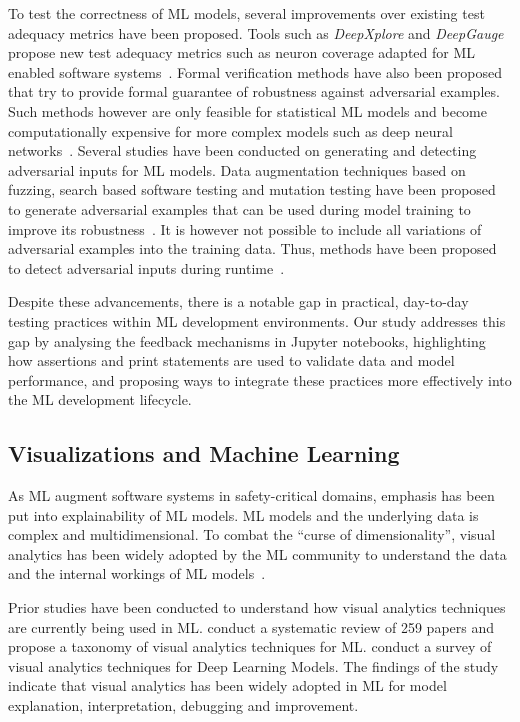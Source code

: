 \documentclass[smallextended]{svjour3}       %
\begin{document}
To test the correctness of ML models, several improvements over existing test adequacy metrics have been proposed. Tools such as \textit{DeepXplore} and \textit{DeepGauge} propose new test adequacy metrics such as neuron coverage adapted for ML enabled software systems~\citep{pei2017deepxplore,ma2018deepgauge,gerasimou2020importance-driven}. Formal verification methods have also been proposed that try to provide formal guarantee of robustness against adversarial examples. Such methods however are only feasible for statistical ML models and become computationally expensive for more complex models such as deep neural networks~\citep{zhu2021deepmemory,baluta2021scalable}. Several studies have been conducted on generating and detecting adversarial inputs for ML models. Data augmentation techniques based on fuzzing, search based software testing and mutation testing have been proposed to generate adversarial examples that can be used during model training to improve its robustness~\citep{braiek2019deepevolution,gao2020fuzz,wang2021robot,zhang2020white-box}. It is however not possible to include all variations of adversarial examples into the training data. Thus, methods have been proposed to detect adversarial inputs during runtime~\citep{xiao2021self-checking,wang2020dissector,wang2019adversarial,berend2020cats}.

Despite these advancements, there is a notable gap in practical, day-to-day testing practices within ML development environments. Our study addresses this gap by analysing the feedback mechanisms in Jupyter notebooks, highlighting how assertions and print statements are used to validate data and model performance, and proposing ways to integrate these practices more effectively into the ML development lifecycle.

\subsection{Visualizations and Machine Learning}\label{sec:visualizations}

As ML augment software systems in safety-critical domains, emphasis has been put into explainability of ML models. ML models and the underlying data is complex and multidimensional. To combat the ``curse of dimensionality'', visual analytics has been widely adopted by the ML community to understand the data and the internal workings of ML models~\citep{yuan2021survey,hohman2019visual,wexler2019what-if}.

Prior studies have been conducted to understand how visual analytics techniques are currently being used in ML. \citet{yuan2021survey} conduct a systematic review of 259 papers and propose a taxonomy of visual analytics techniques for ML. \citet{hohman2019visual} conduct a survey of visual analytics techniques for Deep Learning Models. The findings of the study indicate that visual analytics has been widely adopted in ML for model explanation, interpretation, debugging and improvement.
\end{document}
